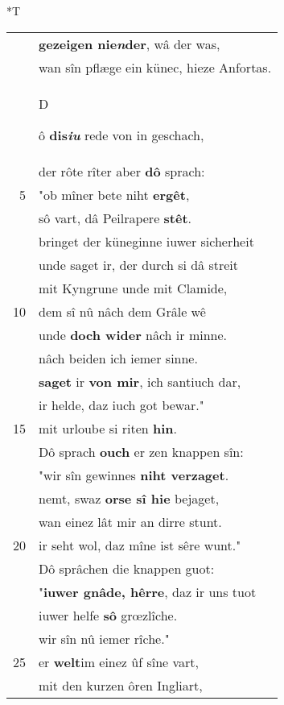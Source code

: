 \documentclass[8pt,a4paper,notitlepage]{article}
\begin{document}
\begin{table}[ht]
\begin{minipage}[t]{0.5\linewidth}
\end{minipage}
\hspace{0.5cm}
\begin{minipage}[t]{0.5\linewidth}
\small
\begin{center}*T
\end{center}
\begin{tabular}{rl}
 & \textbf{gezeigen nie\textit{n}der}, wâ der was,\\ 
 & wan sîn pflæge ein künec, hieze Anfortas.\\ 
 & \begin{large}D\end{large}ô \textbf{dis\textit{iu}} rede von in geschach,\\ 
 & der rôte rîter aber \textbf{dô} sprach:\\ 
5 & "ob mîner bete niht \textbf{ergêt},\\ 
 & sô vart, dâ Peilrapere \textbf{stêt}.\\ 
 & bringet der küneginne iuwer sicherheit\\ 
 & unde saget ir, der durch si dâ streit\\ 
 & mit Kyngrune unde mit Clamide,\\ 
10 & dem sî nû nâch dem Grâle wê\\ 
 & unde \textbf{doch wider} nâch ir minne.\\ 
 & nâch beiden ich iemer sinne.\\ 
 & \textbf{saget} ir \textbf{von mir}, ich santiuch dar,\\ 
 & ir helde, daz iuch got bewar."\\ 
15 & mit urloube si riten \textbf{hin}.\\ 
 & Dô sprach \textbf{ouch} er zen knappen sîn:\\ 
 & "wir sîn gewinnes \textbf{niht verzaget}.\\ 
 & nemt, swaz \textbf{orse sî hie} bejaget,\\ 
 & wan einez lât mir an dirre stunt.\\ 
20 & ir seht wol, daz mîne ist sêre wunt."\\ 
 & Dô sprâchen die knappen guot:\\ 
 & "\textbf{iuwer gnâde, hêrre}, daz ir uns tuot\\ 
 & iuwer helfe \textbf{sô} grœzlîche.\\ 
 & wir sîn nû iemer rîche."\\ 
25 & er \textbf{welt}im einez ûf sîne vart,\\ 
 & mit den kurzen ôren Ingliart,\\ 

\end{tabular}
\end{minipage}
\end{table}
\end{document}
